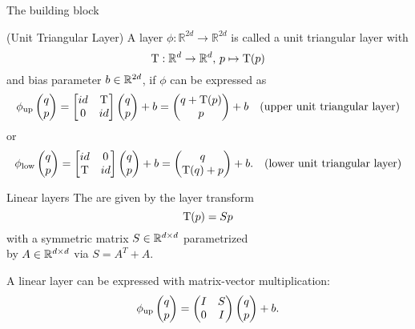 \begin{frame}{The building block}
  \begin{definition}
    (Unit Triangular Layer) A layer $\phi : \mathbb{R}^{2d} \to \mathbb{R}^{2d}$ 
    is called a unit triangular layer with 
    \begin{equation*}
      \mathrm{T} : \mathbb{R}^d \to \mathbb{R}^d,\, p \mapsto \mathrm{T}(p)
    \end{equation*}
    and bias parameter $b \in \mathbb{R}^{2d}$, if $\phi$ can be expressed as
    \begin{equation*}
      \phi_{\text{up}} \begin{pmatrix} q \\ p \end{pmatrix} = \begin{bmatrix} id & {\mathrm{T}} \\ 0 & id \end{bmatrix} \begin{pmatrix} q \\ p \end{pmatrix} + b
      = \begin{pmatrix}
        q + \mathrm{T}(p) \\
        p
      \end{pmatrix} + b \quad \text{(upper unit triangular layer)}
    \end{equation*}
    or
    \begin{equation*}
      \phi_{\text{low}} \begin{pmatrix} q \\ p \end{pmatrix} = \begin{bmatrix} id & 0 \\ {\mathrm{T}} & id \end{bmatrix} \begin{pmatrix} q \\ p \end{pmatrix} + b
      = \begin{pmatrix}
        q \\
        \mathrm{T}(q) + p
      \end{pmatrix} + b. \quad \text{(lower unit triangular layer)}
    \end{equation*}
  \end{definition}

\end{frame}

\begin{frame}[c]{Linear layers}
  The  are given by the layer transform
  \begin{equation*}
    \mathrm{T}(p) = Sp
  \end{equation*}
  with a symmetric matrix $S \in \mathbb{R}^{d \times d}$ parametrized\\
  by $A \in \mathbb{R}^{d \times d}$ via $S=A^T+A$.
  \vspace{1cm}

  A linear layer can be expressed with matrix-vector multiplication:
  \begin{equation*}
    \phi_{\text{up}} \begin{pmatrix} q \\ p \end{pmatrix} = \begin{pmatrix}
      I & S \\
      0 & I
    \end{pmatrix} \begin{pmatrix} q \\ p \end{pmatrix} + b
    .
  \end{equation*}
\end{frame}

